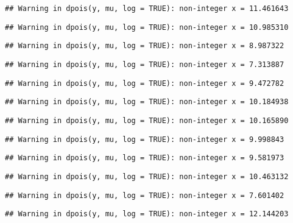 \documentclass[
]{article}
\begin{document}
\begin{verbatim}
## Warning in dpois(y, mu, log = TRUE): non-integer x = 11.461643
\end{verbatim}

\begin{verbatim}
## Warning in dpois(y, mu, log = TRUE): non-integer x = 10.985310
\end{verbatim}

\begin{verbatim}
## Warning in dpois(y, mu, log = TRUE): non-integer x = 8.987322
\end{verbatim}

\begin{verbatim}
## Warning in dpois(y, mu, log = TRUE): non-integer x = 7.313887
\end{verbatim}

\begin{verbatim}
## Warning in dpois(y, mu, log = TRUE): non-integer x = 9.472782
\end{verbatim}

\begin{verbatim}
## Warning in dpois(y, mu, log = TRUE): non-integer x = 10.184938
\end{verbatim}

\begin{verbatim}
## Warning in dpois(y, mu, log = TRUE): non-integer x = 10.165890
\end{verbatim}

\begin{verbatim}
## Warning in dpois(y, mu, log = TRUE): non-integer x = 9.998843
\end{verbatim}

\begin{verbatim}
## Warning in dpois(y, mu, log = TRUE): non-integer x = 9.581973
\end{verbatim}

\begin{verbatim}
## Warning in dpois(y, mu, log = TRUE): non-integer x = 10.463132
\end{verbatim}

\begin{verbatim}
## Warning in dpois(y, mu, log = TRUE): non-integer x = 7.601402
\end{verbatim}

\begin{verbatim}
## Warning in dpois(y, mu, log = TRUE): non-integer x = 12.144203
\end{verbatim}
\end{document}
